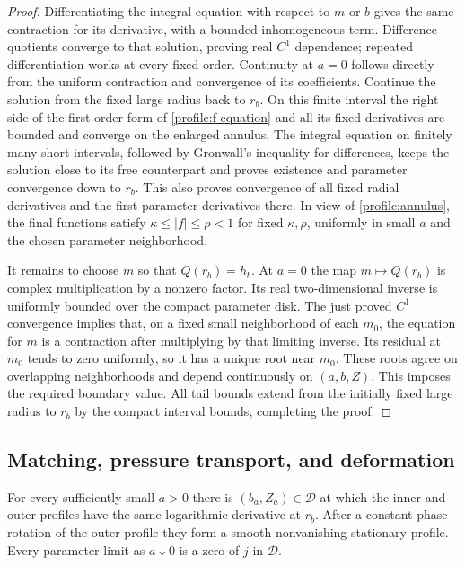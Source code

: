 \begin{proof}
Differentiating the integral equation with respect to $m$ or $b$ gives
the same contraction for its derivative, with a bounded inhomogeneous
term.  Difference quotients converge to that solution, proving real
$C^1$ dependence; repeated differentiation works at every fixed order.
Continuity at $a=0$ follows directly from the uniform contraction and
convergence of its coefficients.  Continue the solution from the fixed
large radius back to $r_b$.  On this finite interval the right side of
the first-order form of \eqref{profile:f-equation} and all its fixed
derivatives are bounded and converge on the enlarged annulus.  The
integral equation on finitely many short intervals, followed by
Gronwall's inequality for differences, keeps the solution close to its
free counterpart and proves existence and parameter convergence down
to $r_b$.  This also proves convergence of all fixed radial derivatives
and the first parameter derivatives there.  In view of
\eqref{profile:annulus}, the final functions satisfy
$\kappa\le|f|\le\rho<1$ for fixed $\kappa,\rho$, uniformly in small
$a$ and the chosen parameter neighborhood.

It remains to choose $m$ so that $Q(r_b)=h_b$.  At $a=0$ the map
$m\mapsto Q(r_b)$ is complex multiplication by a nonzero factor.
Its real two-dimensional inverse is uniformly bounded over the compact
parameter disk.  The just proved $C^1$ convergence implies that, on a
fixed small neighborhood of each $m_0$, the equation for $m$ is a
contraction after multiplying by that limiting inverse.  Its residual
at $m_0$ tends to zero uniformly, so it has a unique root near $m_0$.
These roots agree on overlapping neighborhoods and depend continuously
on $(a,b,Z)$.  This imposes the required boundary value.  All tail bounds
extend from the initially fixed large radius to $r_b$ by the compact
interval bounds, completing the proof.
\end{proof}

\subsection{Matching, pressure transport, and deformation}

\begin{lemma}\label{profile:matching}
For every sufficiently small $a>0$ there is $(b_a,Z_a)\in\mathcal D$
at which the inner and outer profiles have the same logarithmic
derivative at $r_b$.  After a constant phase rotation of the outer
profile they form a smooth nonvanishing stationary profile.  Every
parameter limit as $a\downarrow0$ is a zero of $j$ in $\mathcal D$.
\end{lemma}

